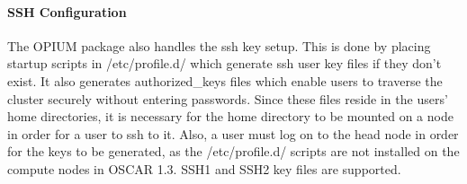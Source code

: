 \paragraph{SSH Configuration}
The OPIUM package also handles the ssh key setup.  This is done by placing
startup scripts in /etc/profile.d/ which generate ssh user key files if 
they don't exist.  It also generates authorized\_keys files which enable
users to traverse the cluster securely without entering passwords.  Since
these files reside in the users' home directories, it is necessary for
the home directory to be mounted on a node in order for a user to ssh to
it.  Also, a user must log on to the head node in order for the keys to
be generated, as the /etc/profile.d/ scripts are not installed on the
compute nodes in OSCAR 1.3.  SSH1 and SSH2 key files are supported.  

